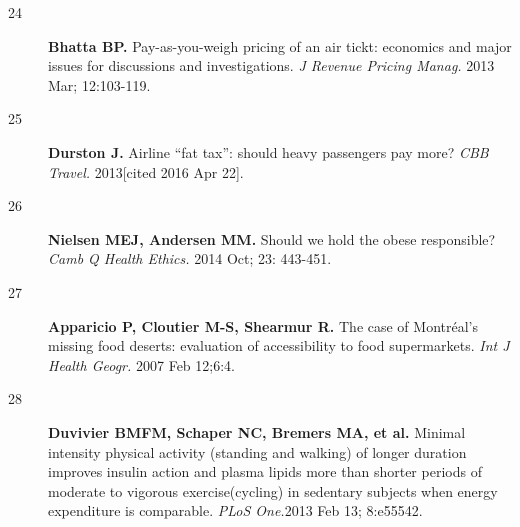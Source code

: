 \documentclass[11pt]{article}  %
\begin{document}
\begin{description}
  \item[24]\textbf{Bhatta BP.} Pay-as-you-weigh pricing of an air tickt: economics and major issues for discussions and investigations. \textit{J Revenue Pricing Manag.} 2013 Mar; 12:103-119.
  \item[25]\textbf{Durston J.} Airline ``fat tax'': should heavy passengers pay more? \textit{CBB Travel.} 2013[cited 2016 Apr 22].
  \item[26]\textbf{Nielsen MEJ, Andersen MM. }Should we hold the obese responsible? \textit{Camb Q Health Ethics.} 2014 Oct; 23: 443-451.
  \item[27]\textbf{Apparicio P, Cloutier M-S, Shearmur R.} The case of Montr\'{e}al's missing food deserts: evaluation of accessibility to food supermarkets. \textit{Int J Health Geogr.} 2007 Feb 12;6:4.
  \item[28]\textbf{Duvivier BMFM, Schaper NC, Bremers MA, et al.} Minimal intensity physical activity (standing and walking) of longer duration improves insulin action and plasma lipids more than shorter periods of moderate to vigorous exercise(cycling) in sedentary subjects when energy expenditure is comparable. \textit{PLoS One.}2013 Feb 13; 8:e55542.
\end{description}


\end{document}
